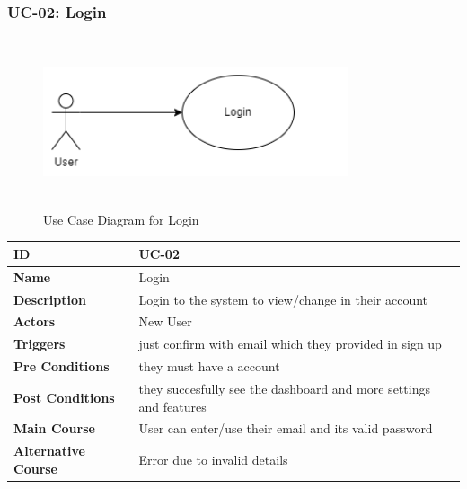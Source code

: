     \subsubsection{UC-02: Login}
    \begin{figure}[H]
        \includegraphics[height=5cm, width=0.8\textwidth]{./diagrams/Use Case/u2.png}
        \centering 
        \caption{Use Case Diagram for Login}
        \label{Usecase1}
        \end{figure}
        
    
    \begin{center}
        \begin{tabularx}{\textwidth}{|l|X|}
            \hline
            \textbf{ID} & UC-02 \\
            \hline
            \textbf{Name} & Login \\
            \hline
            \textbf{Description} & Login to the system to view/change in their account \\
            \hline
            \textbf{Actors} & New User \\
            \hline
            \textbf{Triggers} & just confirm with email which they provided in sign up \\
            \hline
            \textbf{Pre Conditions} & they must have a account \\
            \hline
            \textbf{Post Conditions} & they succesfully see the dashboard and more settings and features \\
            \hline
            \textbf{Main Course} & User can enter/use their email and its valid password \\
            \hline
            \textbf{Alternative Course} & Error due to invalid details \\
            \hline
            
        \end{tabularx}
    \end{center}
    \newpage
    

